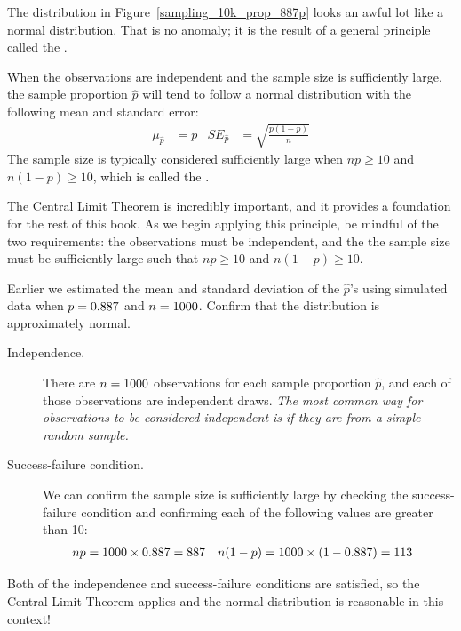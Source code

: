 The distribution in
Figure~\ref{sampling_10k_prop_887p} looks an awful lot like
a normal distribution. That is no anomaly; it is the result
of a general principle called the .

\begin{termBox}{
When the observations are independent and the sample size is
sufficiently large, the sample proportion $\hat{p}$ will tend
to follow a normal distribution with the following mean and
standard error:
\begin{align*}
  \mu_{\hat{p}} &= p
  &SE_{\hat{p}} &= \sqrt{\frac{p (1 - p)}{n}}
\end{align*}
The sample size is typically considered sufficiently large when
$np \geq 10$ and $n(1-p) \geq 10$, which is called the
.} %
\end{termBox}

The Central Limit Theorem is incredibly important, and it provides
a foundation for the rest of this book. As we begin applying
this principle, be mindful of the two requirements:
the observations must be independent, and the the sample size must
be sufficiently large such that $np \geq 10$ and $n(1-p) \geq 10$.

\begin{example}{Earlier we estimated the mean and standard
deviation of the $\hat{p}$'s using simulated data when
$p = 0.887{}$ and $n = 1000{}$.
Confirm that the distribution is approximately
normal.}\label{sample_p887_n1000_confirm_normal}
\begin{description}
\item[Independence.] There are $n = 1000{}$
    observations for each
    sample proportion $\hat{p}$, and each of those observations
    are independent draws. \emph{The most common way for
    observations to be considered independent is if they are from
    a simple random sample.}
\item[Success-failure condition.] We can confirm the sample size
    is sufficiently large by checking the success-failure condition
    and confirming each of the following values are greater than 10:
    \begin{align*}
    np &= 1000{} \times 0.887{}
        = 887{}
    &n(1-p) &= 1000{} \times (1 - 0.887{})
        = 113{}
    \end{align*}
\end{description}
Both of the independence and success-failure conditions are
satisfied, so the Central Limit Theorem applies and the normal
distribution is reasonable in this context!
\end{example}

